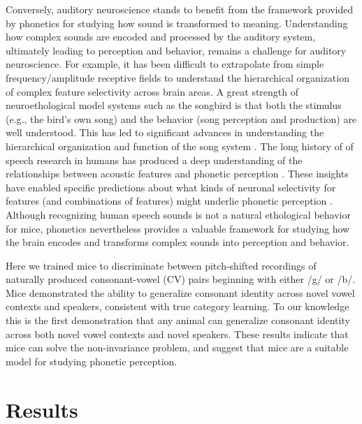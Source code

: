 \documentclass[preprint, NumberedRefs]{JASAnew}\usepackage[]{graphicx}\usepackage[]{color}
\begin{document}
Conversely, auditory neuroscience stands to benefit from the framework provided by phonetics for studying how sound is transformed to meaning. Understanding how complex sounds are encoded and processed by the auditory system, ultimately leading to perception and behavior, remains a challenge for auditory neuroscience. For example, it has been difficult to extrapolate from simple frequency/amplitude receptive fields to understand the hierarchical organization of complex feature selectivity across brain areas. A great strength of neuroethological model systems such as the songbird is that both the stimulus (e.g., the bird's own song) and the behavior (song perception and production) are well understood. This has led to significant advances in understanding the hierarchical organization and function of the song system \cite{Brenowitz1997,Theunissen2014}. The long history of of speech research in humans has produced a deep understanding of the relationships between acoustic features and phonetic perception \cite{Peterson1952}. These insights have enabled specific predictions about what kinds of neuronal selectivity for features (and combinations of features) might underlie phonetic perception \cite{Sussman1998}. Although recognizing human speech sounds is not a natural ethological behavior for mice, phonetics nevertheless provides a valuable framework for studying how the brain encodes and transforms complex sounds into perception and behavior.

Here we trained mice to discriminate between pitch-shifted recordings of naturally produced consonant-vowel (CV) pairs beginning with either /g/ or /b/. Mice demonstrated the ability to generalize consonant identity across novel vowel contexts and speakers, consistent with true category learning. To our knowledge this is the first demonstration that any animal can generalize consonant identity across both novel vowel contexts and novel speakers. These results indicate that mice can solve the non-invariance problem, and suggest that mice are a suitable model for studying phonetic perception.

%
%

\section{\Large Results}
\end{document}
